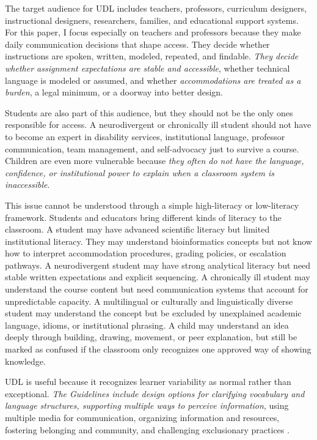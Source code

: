 \documentclass[11pt]{article}
\begin{document}
The target audience for UDL includes teachers, professors, curriculum designers, instructional designers, researchers, families, and educational support systems. For this paper, I focus especially on teachers and professors because they make daily communication decisions that shape access. They decide whether instructions are spoken, written, modeled, repeated, and findable. \textit{They decide whether assignment expectations are stable and accessible}, whether technical language is modeled or assumed, and whether \textit{accommodations are treated as a burden}, a legal minimum, or a doorway into better design.

Students are also part of this audience, but they should not be the only ones responsible for access. A neurodivergent or chronically ill student should not have to become an expert in disability services, institutional language, professor communication, team management, and self-advocacy just to survive a course. Children are even more vulnerable because \textit{they often do not have the language, confidence, or institutional power to explain when a classroom system is inaccessible}.


This issue cannot be understood through a simple high-literacy or low-literacy framework. Students and educators bring different kinds of literacy to the classroom. A student may have advanced scientific literacy but limited institutional literacy. They may understand bioinformatics concepts but not know how to interpret accommodation procedures, grading policies, or escalation pathways. A neurodivergent student may have strong analytical literacy but need stable written expectations and explicit sequencing. A chronically ill student may understand the course content but need communication systems that account for unpredictable capacity. A multilingual or culturally and linguistically diverse student may understand the concept but be excluded by unexplained academic language, idioms, or institutional phrasing. A child may understand an idea deeply through building, drawing, movement, or peer explanation, but still be marked as confused if the classroom only recognizes one approved way of showing knowledge.

UDL is useful because it recognizes learner variability as normal rather than exceptional. \textit{The Guidelines include design options for clarifying vocabulary and language structures, supporting multiple ways to perceive information}, using multiple media for communication, organizing information and resources, fostering belonging and community, and challenging exclusionary practices \citep{cast2024udl}.
\end{document}

